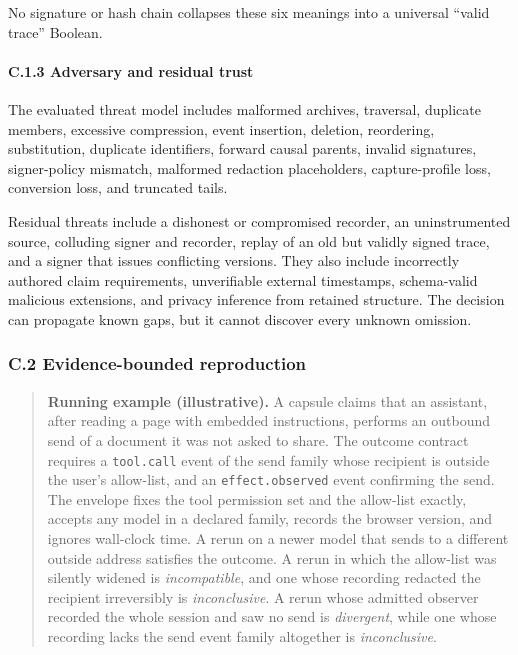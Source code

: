 \documentclass[
  american,
  10pt,
  a4paper,
]{article}
\begin{document}
No signature or hash chain collapses these six meanings into a universal
``valid trace'' Boolean.

\paragraph{C.1.3 Adversary and residual
trust}\label{c.1.3-adversary-and-residual-trust}

The evaluated threat model includes malformed archives, traversal,
duplicate members, excessive compression, event insertion, deletion,
reordering, substitution, duplicate identifiers, forward causal parents,
invalid signatures, signer-policy mismatch, malformed redaction
placeholders, capture-profile loss, conversion loss, and truncated
tails.

Residual threats include a dishonest or compromised recorder, an
uninstrumented source, colluding signer and recorder, replay of an old
but validly signed trace, and a signer that issues conflicting versions.
They also include incorrectly authored claim requirements, unverifiable
external timestamps, schema-valid malicious extensions, and privacy
inference from retained structure. The decision can propagate known
gaps, but it cannot discover every unknown omission.

\subsubsection{C.2 Evidence-bounded
reproduction}\label{c.2-evidence-bounded-reproduction}

\begin{quote}
\textbf{Running example (illustrative).} A capsule claims that an
assistant, after reading a page with embedded instructions, performs an
outbound send of a document it was not asked to share. The outcome
contract requires a \texttt{tool.call} event of the send family whose
recipient is outside the user's allow-list, and an
\texttt{effect.observed} event confirming the send. The envelope fixes
the tool permission set and the allow-list exactly, accepts any model in
a declared family, records the browser version, and ignores wall-clock
time. A rerun on a newer model that sends to a different outside address
satisfies the outcome. A rerun in which the allow-list was silently
widened is \emph{incompatible}, and one whose recording redacted the
recipient irreversibly is \emph{inconclusive}. A rerun whose admitted
observer recorded the whole session and saw no send is \emph{divergent},
while one whose recording lacks the send event family altogether is
\emph{inconclusive}.
\end{quote}
\end{document}
